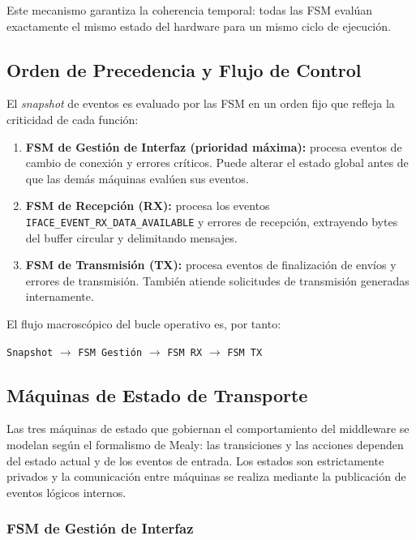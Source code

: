 Este mecanismo garantiza la coherencia temporal: todas las FSM evalúan exactamente el mismo estado del hardware para un mismo ciclo de ejecución.

\subsection{Orden de Precedencia y Flujo de Control}
\label{subsec:orden-precedencia}

El \textit{snapshot} de eventos es evaluado por las FSM en un orden fijo que refleja la criticidad de cada función:

\begin{enumerate}
    \item \textbf{FSM de Gestión de Interfaz (prioridad máxima):} procesa eventos de cambio de conexión y errores críticos. Puede alterar el estado global antes de que las demás máquinas evalúen sus eventos.
    \item \textbf{FSM de Recepción (RX):} procesa los eventos \texttt{IFACE\_EVENT\_RX\_DATA\_AVAILABLE} y errores de recepción, extrayendo bytes del buffer circular y delimitando mensajes.
    \item \textbf{FSM de Transmisión (TX):} procesa eventos de finalización de envíos y errores de transmisión. También atiende solicitudes de transmisión generadas internamente.
\end{enumerate}

El flujo macroscópico del bucle operativo es, por tanto:

\begin{center}
\texttt{Snapshot} $\rightarrow$ \texttt{FSM Gestión} $\rightarrow$ \texttt{FSM RX} $\rightarrow$ \texttt{FSM TX}
\end{center}

\subsection{Máquinas de Estado de Transporte}
\label{subsec:fsms-transporte}

Las tres máquinas de estado que gobiernan el comportamiento del middleware se modelan según el formalismo de Mealy: las transiciones y las acciones dependen del estado actual y de los eventos de entrada. Los estados son estrictamente privados y la comunicación entre máquinas se realiza mediante la publicación de eventos lógicos internos.

\subsubsection{FSM de Gestión de Interfaz}
\label{subsubsec:fsm-gestion}

